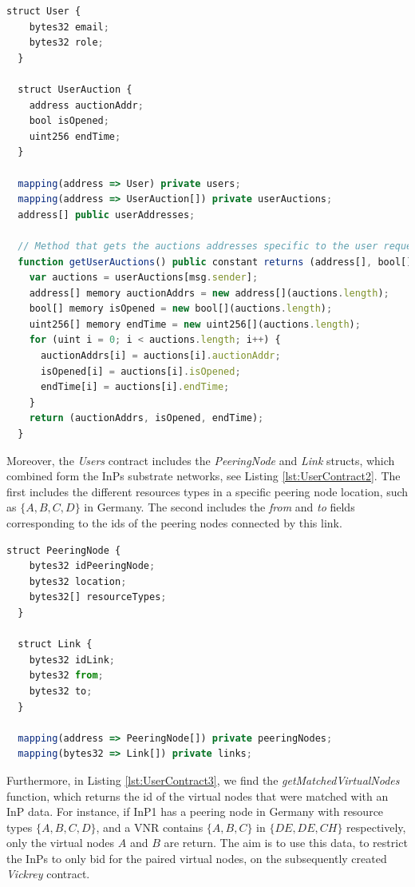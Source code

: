 \begin{lstlisting}[language=JavaScript,caption={Data structures and functions related to the user data in the Users contract. },label={lst:UserContract1}]
  struct User {
    bytes32 email;
    bytes32 role;
  }
  
  struct UserAuction {
    address auctionAddr;
    bool isOpened;
    uint256 endTime;
  }

  mapping(address => User) private users;
  mapping(address => UserAuction[]) private userAuctions;
  address[] public userAddresses;
  
  // Method that gets the auctions addresses specific to the user requesting it
  function getUserAuctions() public constant returns (address[], bool[], uint256[]) {
    var auctions = userAuctions[msg.sender];
    address[] memory auctionAddrs = new address[](auctions.length);
    bool[] memory isOpened = new bool[](auctions.length);
    uint256[] memory endTime = new uint256[](auctions.length);
    for (uint i = 0; i < auctions.length; i++) {
      auctionAddrs[i] = auctions[i].auctionAddr;
      isOpened[i] = auctions[i].isOpened;
      endTime[i] = auctions[i].endTime;
    }
    return (auctionAddrs, isOpened, endTime);
  }
\end{lstlisting}

Moreover, the \textit{Users} contract includes the \textit{PeeringNode} and \textit{Link} structs, which combined form the InPs substrate networks, see Listing \ref{lst:UserContract2}. The first includes the different resources types in a specific peering node location, such as $\{A, B, C, D\}$ in Germany. The second includes the \textit{from} and \textit{to} fields corresponding to the ids of the peering nodes connected by this link.
\newline

\begin{lstlisting}[language=JavaScript,caption={Data structures related to the peering nodes and links in the Users contract.}, label={lst:UserContract2}]
  struct PeeringNode {
    bytes32 idPeeringNode;
    bytes32 location;
    bytes32[] resourceTypes;
  }
  
  struct Link {
    bytes32 idLink;
    bytes32 from;
    bytes32 to;
  }

  mapping(address => PeeringNode[]) private peeringNodes;
  mapping(bytes32 => Link[]) private links;
\end{lstlisting}

Furthermore, in Listing \ref{lst:UserContract3}, we find the \textit{getMatchedVirtualNodes} function, which returns the id of the virtual nodes that were matched with an InP data. For instance, if InP1 has a peering node in Germany with resource types $\{A,B,C,D\}$, and a VNR contains $\{A, B, C\}$ in $\{DE, DE, CH\}$ respectively, only the virtual nodes $A$ and $B$ are return. The aim is to use this data, to restrict the InPs to only bid for the paired virtual nodes, on the subsequently created \textit{Vickrey} contract.


